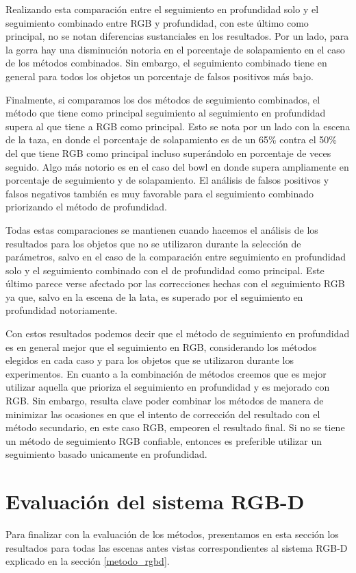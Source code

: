 Realizando esta comparación entre el seguimiento en profundidad solo y el seguimiento combinado entre RGB y profundidad, con este último como principal, no se notan diferencias sustanciales en los resultados. Por un lado, para la gorra hay una disminución notoria en el porcentaje de solapamiento en el caso de los métodos combinados. Sin embargo, el seguimiento combinado tiene en general para todos los objetos un porcentaje de falsos positivos más bajo.

Finalmente, si comparamos los dos métodos de seguimiento combinados, el método que tiene como principal seguimiento al seguimiento en profundidad supera al que tiene a RGB como principal. Esto se nota por un lado con la escena de la taza, en donde el porcentaje de solapamiento es de un 65\% contra el 50\% del que tiene RGB como principal incluso superándolo en porcentaje de veces seguido. Algo más notorio es en el caso del bowl en donde supera ampliamente en porcentaje de seguimiento y de solapamiento. El análisis de falsos positivos y falsos negativos también es muy favorable para el seguimiento combinado priorizando el método de profundidad.

Todas estas comparaciones se mantienen cuando hacemos el análisis de los resultados para los objetos que no se utilizaron durante la selección de parámetros, salvo en el caso de la comparación entre seguimiento en profundidad solo y el seguimiento combinado con el de profundidad como principal. Este último parece verse afectado por las correcciones hechas con el seguimiento RGB ya que, salvo en la escena de la lata, es superado por el seguimiento en profundidad notoriamente.

Con estos resultados podemos decir que el método de seguimiento en profundidad es en general mejor que el seguimiento en RGB, considerando los métodos elegidos en cada caso y para los objetos que se utilizaron durante los experimentos. En cuanto a la combinación de métodos creemos que es mejor utilizar aquella que prioriza el seguimiento en profundidad y es mejorado con RGB. Sin embargo, resulta clave poder combinar los métodos de manera de minimizar las ocasiones en que el intento de corrección del resultado con el método secundario, en este caso RGB, empeoren el resultado final. Si no se tiene un método de seguimiento RGB confiable, entonces es preferible utilizar un seguimiento basado unicamente en profundidad.


\section{Evaluación del sistema RGB-D}\label{sec:evaluacion_rgbd}
Para finalizar con la evaluación de los métodos, presentamos en esta sección los resultados para todas las escenas antes vistas correspondientes al sistema RGB-D explicado en la sección \ref{metodo_rgbd}.

